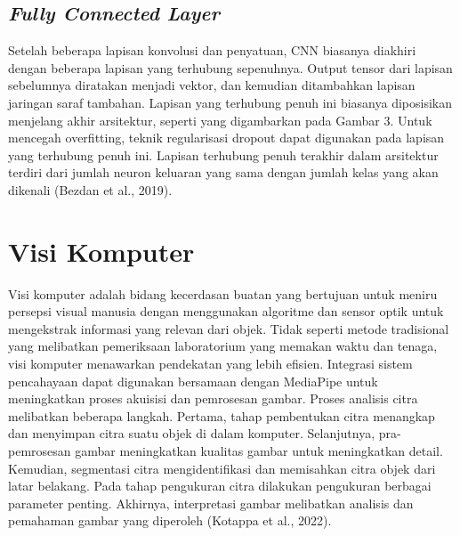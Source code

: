 \subsection{\emph{Fully Connected Layer}}
\label{subsec:cnn}

Setelah beberapa lapisan konvolusi dan penyatuan, CNN biasanya diakhiri dengan beberapa lapisan yang terhubung sepenuhnya. Output tensor dari lapisan sebelumnya diratakan menjadi vektor, dan kemudian ditambahkan lapisan jaringan saraf tambahan. Lapisan yang terhubung penuh ini biasanya diposisikan menjelang akhir arsitektur, seperti yang digambarkan pada Gambar 3. Untuk mencegah overfitting, teknik regularisasi dropout dapat digunakan pada lapisan yang terhubung penuh ini. Lapisan terhubung penuh terakhir dalam arsitektur terdiri dari jumlah neuron keluaran yang sama dengan jumlah kelas yang akan dikenali (Bezdan et al., 2019).

\section{Visi Komputer}
\label{sec:deteksigesturtubuh}

Visi komputer adalah bidang kecerdasan buatan yang bertujuan untuk meniru persepsi visual manusia dengan menggunakan algoritme dan sensor optik untuk mengekstrak informasi yang relevan dari objek. Tidak seperti metode tradisional yang melibatkan pemeriksaan laboratorium yang memakan waktu dan tenaga, visi komputer menawarkan pendekatan yang lebih efisien. Integrasi sistem pencahayaan dapat digunakan bersamaan dengan MediaPipe untuk meningkatkan proses akuisisi dan pemrosesan gambar. Proses analisis citra melibatkan beberapa langkah. Pertama, tahap pembentukan citra menangkap dan menyimpan citra suatu objek di dalam komputer. Selanjutnya, pra-pemrosesan gambar meningkatkan kualitas gambar untuk meningkatkan detail. Kemudian, segmentasi citra mengidentifikasi dan memisahkan citra objek dari latar belakang. Pada tahap pengukuran citra dilakukan pengukuran berbagai parameter penting. Akhirnya, interpretasi gambar melibatkan analisis dan pemahaman gambar yang diperoleh (Kotappa  et al., 2022).


